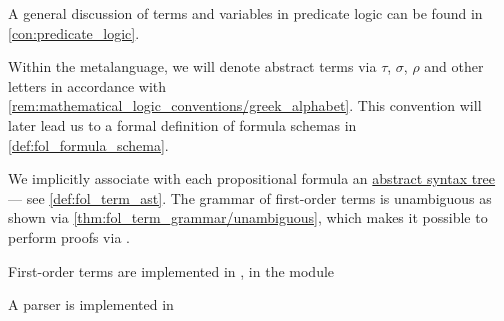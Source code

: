 \begin{comments}
  \item A general discussion of terms and variables in predicate logic can be found in \cref{con:predicate_logic}.

  \item Within the metalanguage, we will denote abstract terms via \( \tau \), \( \sigma \), \( \rho \) and other letters in accordance with \cref{rem:mathematical_logic_conventions/greek_alphabet}. This convention will later lead us to a formal definition of formula schemas in \cref{def:fol_formula_schema}.

  \item We implicitly associate with each propositional formula an \hyperref[con:abstract_syntax_tree]{abstract syntax tree} --- see \cref{def:fol_term_ast}. The grammar of first-order terms is unambiguous as shown via \cref{thm:fol_term_grammar/unambiguous}, which makes it possible to perform proofs via .

  \item First-order terms are implemented in \cite{notebook:code}, in the module
  \begin{CodeRefDisplay}
  \end{CodeRefDisplay}

  A parser is implemented in
  \begin{CodeRefDisplay}
  \end{CodeRefDisplay}
\end{comments}

